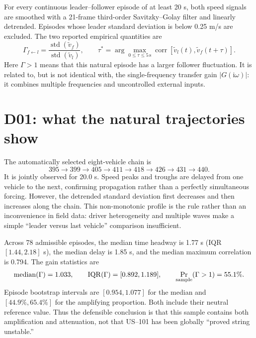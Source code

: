 \documentclass[11pt,a4paper,openany]{book}
\numberwithin{equation}{chapter}
\numberwithin{figure}{chapter}
\numberwithin{table}{chapter}
\begin{document}
For every continuous leader--follower episode of at least 20 s, both speed signals are smoothed with a 21-frame third-order Savitzky--Golay filter and linearly detrended. Episodes whose leader standard deviation is below 0.25 m/s are excluded. The two reported empirical quantities are
\begin{equation}
\Gamma_{f\leftarrow l}=\frac{\operatorname{std}(\widetilde v_f)}{\operatorname{std}(\widetilde v_l)},\qquad
\tau^*=\arg\max_{0\le\tau\le5\,\mathrm{s}}\operatorname{corr}[\widetilde v_l(t),\widetilde v_f(t+\tau)].
\label{eq:ngsim-gain}
\end{equation}
Here $\Gamma>1$ means that this natural episode has a larger follower fluctuation. It is related to, but is not identical with, the single-frequency transfer gain $|G(\mathrm{i}\omega)|$: it combines multiple frequencies and uncontrolled external inputs.

\section{D01: what the natural trajectories show}
The automatically selected eight-vehicle chain is
\[
395\rightarrow399\rightarrow405\rightarrow411\rightarrow418\rightarrow426\rightarrow431\rightarrow440.
\]
It is jointly observed for 20.0 s. Speed peaks and troughs are delayed from one vehicle to the next, confirming propagation rather than a perfectly simultaneous forcing. However, the detrended standard deviation first decreases and then increases along the chain. This non-monotonic profile is the rule rather than an inconvenience in field data: driver heterogeneity and multiple waves make a simple ``leader versus last vehicle'' comparison insufficient.

Across 78 admissible episodes, the median time headway is 1.77 s (IQR $[1.44,2.18]$ s), the median delay is 1.85 s, and the median maximum correlation is 0.794. The gain statistics are
\begin{equation}
\operatorname{median}(\Gamma)=1.033,\qquad \operatorname{IQR}(\Gamma)=[0.892,1.189],\qquad \Pr_{\rm sample}(\Gamma>1)=55.1\%.
\end{equation}
Episode bootstrap intervals are $[0.954,1.077]$ for the median and $[44.9\%,65.4\%]$ for the amplifying proportion. Both include their neutral reference value. Thus the defensible conclusion is that this sample contains both amplification and attenuation, not that US--101 has been globally ``proved string unstable.''
\end{document}
